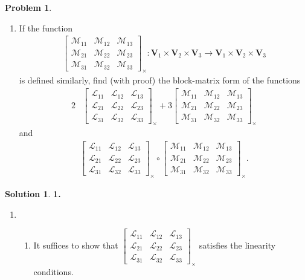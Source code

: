 \documentclass{book}
\theoremstyle{definition}
\newtheorem*{prob*}{Problem}
\newtheorem*{sln*}{Solution}
\newcommand{\V}{\mathbf{V}}
\newcommand{\lag}{\mathcal{L}}
\newcommand{\M}{\mathcal{M}}
\begin{document}
\begin{prob*}
\begin{enumerate}
		\item If the function
		\begin{align*}
		\begin{bmatrix}
		\M_{11} & \M_{12} & \M_{13}\\
		\M_{21} & \M_{22} & \M_{23}\\
		\M_{31} & \M_{32} & \M_{33}
		\end{bmatrix}_\times : \V_1 \times \V_2 \times \V_3 \to \V_1\times\V_2\times \V_3
		\end{align*}
		is defined similarly, find (with proof) the block-matrix form of the functions
		\begin{align*}
		2&\begin{bmatrix}
		\lag_{11} & \lag_{12} & \lag_{13}\\
		\lag_{21} & \lag_{22} & \lag_{23}\\
		\lag_{31} & \lag_{32} & \lag_{33}
		\end{bmatrix}_\times 
		+ 
		3\begin{bmatrix}
		\M_{11} & \M_{12} & \M_{13}\\
		\M_{21} & \M_{22} & \M_{23}\\
		\M_{31} & \M_{32} & \M_{33}
		\end{bmatrix}_\times 
		\end{align*}
		and
		\begin{align*}
		\begin{bmatrix}
		\lag_{11} & \lag_{12} & \lag_{13}\\
		\lag_{21} & \lag_{22} & \lag_{23}\\
		\lag_{31} & \lag_{32} & \lag_{33}
		\end{bmatrix}_\times
		\circ 
		\begin{bmatrix}
		\M_{11} & \M_{12} & \M_{13}\\
		\M_{21} & \M_{22} & \M_{23}\\
		\M_{31} & \M_{32} & \M_{33}
		\end{bmatrix}_\times.
		\end{align*}
	\end{enumerate}
	
	\newpage
	
	\begin{sln*}\textbf{1. }
		\begin{enumerate}
			\item 
			\begin{enumerate}
			\item It suffices to show that $\begin{bmatrix}
			\lag_{11} & \lag_{12} & \lag_{13}\\
			\lag_{21} & \lag_{22} & \lag_{23}\\
			\lag_{31} & \lag_{32} & \lag_{33}
			\end{bmatrix}_\times$ satisfies the linearity conditions.\\
			

\end{enumerate}
\end{enumerate}
\end{sln*}
\end{prob*}
\end{document}

